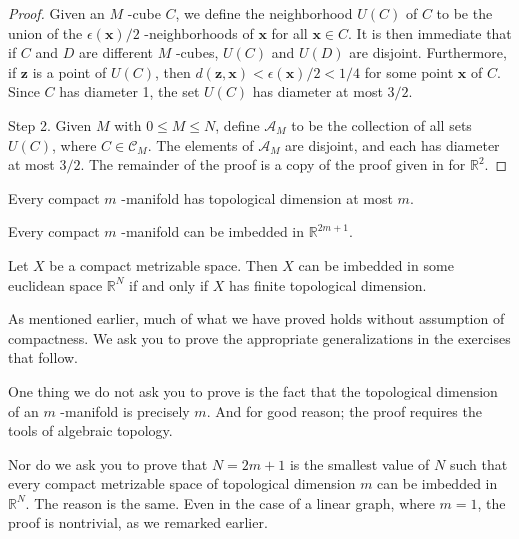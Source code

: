 \begin{proof}
Given an \(M\) -cube \(C\), we define the neighborhood \(U( C)\) of \(C\) to be the union of the \(\epsilon ( \mathbf{x}) /2\) -neighborhoods of \(\mathbf{x}\) for all \(\mathbf{x} \in C\). It is then immediate that if \(C\) and \(D\) are different \(M\) -cubes, \(U( C)\) and \(U( D)\) are disjoint. Furthermore, if \(\mathbf{z}\) is a point of \(U( C)\), then \(d({\mathbf{z},\mathbf{x}}) < \epsilon ( \mathbf{x}) /2 < 1/4\) for some point \(\mathbf{x}\) of \(C\). Since \(C\) has diameter 1, the set \(U( C)\) has diameter at most \(3/2\).

Step 2. Given \(M\) with \(0 \leq M \leq N\), define \(\mathcal{A}_{M}\) to be the collection of all sets \(U( C)\), where \(C \in {\mathcal{C}}_{M}\). The elements of \(\mathcal{A}_{M}\) are disjoint, and each has diameter at most \(3/2\). The remainder of the proof is a copy of the proof given in  for \(\mathbb{R}^{2}\).
\end{proof}
\begin{corollary}
\label{cor:\thetheorem}
Every compact \(m\) -manifold has topological dimension at most \(m\).
\end{corollary}

\begin{corollary}
\label{cor:\thetheorem}
Every compact \(m\) -manifold can be imbedded in \(\mathbb{R}^{{2m} + 1}\).
\end{corollary}

\begin{corollary}
\label{cor:\thetheorem}
Let \(X\) be a compact metrizable space. Then \(X\) can be imbedded in some euclidean space \(\mathbb{R}^{N}\) if and only if \(X\) has finite topological dimension.
\end{corollary}

As mentioned earlier, much of what we have proved holds without assumption of compactness. We ask you to prove the appropriate generalizations in the exercises that follow.

One thing we do not ask you to prove is the fact that the topological dimension of an \(m\) -manifold is precisely \(m\). And for good reason; the proof requires the tools of algebraic topology.

Nor do we ask you to prove that \(N = {2m} + 1\) is the smallest value of \(N\) such that every compact metrizable space of topological dimension \(m\) can be imbedded in \(\mathbb{R}^{N}\). The reason is the same. Even in the case of a linear graph, where \(m = 1\), the proof is nontrivial, as we remarked earlier.


